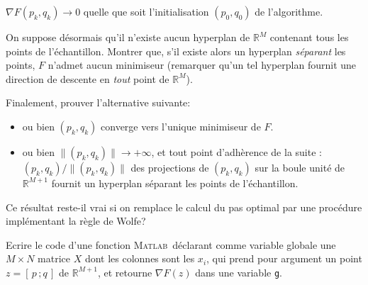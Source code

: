 \documentclass[12pt,a4paper,fleqn]{report}
\newcommand{\matlab}{\textsc{Matlab}}
\newcommand{\R}{\mathbb R}
\newcommand{\grad}{\nabla}
\begin{document}
\begin{exercice}[(scoring)]
\begin{questions}
$\grad F(p_k,q_k)\rightarrow 0$ quelle que soit l'initialisation $(p_0,q_0)$ de l'algorithme.
\item On suppose d\'esormais qu'il n'existe aucun hyperplan de $\R^M$ contenant tous les points de l'\'echantillon. Montrer que, s'il existe alors un hyperplan \textit{s\'eparant} les points, $F$ n'admet aucun minimiseur (remarquer qu'un tel hyperplan fournit une direction de descente en \textit{tout} point de $\R^M$).
\item Finalement, prouver l'alternative suivante:
\begin{itemize}
\item ou bien $(p_k,q_k)$ converge vers l'unique minimiseur de $F$.
\item ou bien $\|(p_k,q_k)\| \rightarrow +\infty$, et tout point d'adh\`erence de la suite : $(p_k,q_k)/\|(p_k,q_k)\|$ des projections de $(p_k,q_k)$ sur la boule unit\'e de $\R^{M+1}$ fournit un hyperplan s\'eparant les points de l'\'echantillon.
\end{itemize}
Ce r\'esultat reste-il vrai si on remplace le calcul du pas optimal par une proc\'edure impl\'ementant la r\`egle de Wolfe?
\item Ecrire le code d'une fonction \matlab\ d\'eclarant comme variable globale une $M\times N$ matrice $X$ dont les colonnes sont les $x_i$, qui prend pour argument un point $z=[\,p\,; q\,]$ de $\R^{M+1}$, et retourne $\grad F(z)$ dans une variable \texttt g.
\end{questions}
\end{exercice}
\end{document}
